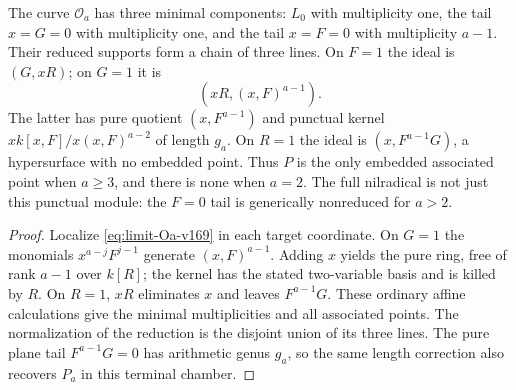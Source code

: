 \begin{proposition}\label{prop:terminal-v169}
The curve $\mathcal O_a$ has three minimal components: $L_0$ with
multiplicity one, the tail $x=G=0$ with multiplicity one, and the
tail $x=F=0$ with multiplicity $a-1$. Their reduced supports form a
chain of three lines. On $F=1$ the ideal is $(G,xR)$; on $G=1$ it is
\[
 (xR,(x,F)^{a-1}).
\]
The latter has pure quotient $(x,F^{a-1})$ and punctual kernel
$xk[x,F]/x(x,F)^{a-2}$ of length $g_a$. On $R=1$ the ideal is
$(x,F^{a-1}G)$, a hypersurface with no embedded point. Thus $P$ is
the only embedded associated point when $a\geq3$, and there is none
when $a=2$. The full nilradical is not just this punctual module:
the $F=0$ tail is generically nonreduced for $a>2$.
\end{proposition}
\begin{proof}
Localize \eqref{eq:limit-Oa-v169} in each target coordinate. On $G=1$
the monomials $x^{a-j}F^{j-1}$ generate $(x,F)^{a-1}$.
Adding $x$ yields the pure ring, free of rank $a-1$ over $k[R]$;
the kernel has the stated two-variable basis and is killed by $R$.
On $R=1$, $xR$ eliminates $x$ and leaves $F^{a-1}G$.
These ordinary affine calculations give the minimal multiplicities
and all associated points. The normalization of the reduction is the
disjoint union of its three lines. The pure plane tail
$F^{a-1}G=0$ has arithmetic genus $g_a$, so the same length correction
also recovers $P_a$ in this terminal chamber.
\end{proof}

